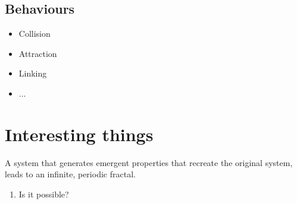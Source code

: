 \documentclass{article}
\begin{document}
  \subsection{Behaviours}
    \begin{itemize}
      \item Collision
      \item Attraction
      \item Linking
      \item ...
    \end{itemize}


\section{Interesting things}

  A system that generates emergent properties that recreate the original system, leads to an infinite, periodic fractal. 
  \begin{enumerate}[label=\textbf{\alph*)}]
    \item Is it possible?
  \end{enumerate}
\end{document}
